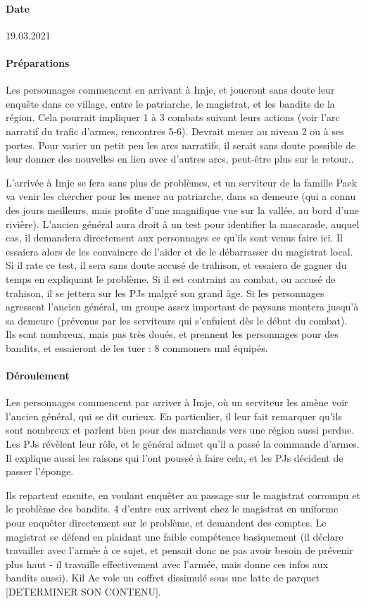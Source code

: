 \documentclass[10pt,a4paper]{book}
\begin{document}
\paragraph{Date}19.03.2021
\paragraph{Préparations}
Les personnages commencent en arrivant à Imje, et joueront sans doute leur enquête dans ce village, entre le patriarche, le magistrat, et les bandits de la région. Cela pourrait impliquer 1 à 3 combats suivant leurs actions (voir l'arc narratif du trafic d'armes, rencontres 5-6). Devrait mener au niveau 2 ou à ses portes. Pour varier un petit peu les arcs narratifs, il serait sans doute possible de leur donner des nouvelles en lien avec d'autres arcs, peut-être plus sur le retour.. 

L'arrivée à Imje se fera sans plus de problèmes, et un serviteur de la famille Paek va venir les chercher pour les mener au patriarche, dans sa demeure (qui a connu des jours meilleurs, mais profite d'une magnifique vue sur la vallée, au bord d'une rivière). L'ancien général aura droit à un test pour identifier la mascarade, auquel cas, il demandera directement aux personnages ce qu'ils sont venus faire ici. Il essaiera alors de les convaincre de l'aider et de le débarrasser du magistrat local. Si il rate ce test, il sera sans doute accusé de trahison, et essaiera de gagner du temps en expliquant le problème. Si il est contraint au combat, ou accusé de trahison, il se jettera sur les PJs malgré son grand âge. Si les personnages agressent l'ancien général, un groupe assez important de paysans montera jusqu'à sa demeure (prévenus par les serviteurs qui s'enfuient dès le début du combat). Ils sont nombreux, mais pas très doués, et prennent les personnages pour des bandits, et essaieront de les tuer : 8 commoners mal équipés.
\paragraph{Déroulement}
Les personnages commencent par arriver à Imje, où un serviteur les amène voir l'ancien général, qui se dit curieux. En particulier, il leur fait remarquer qu'ils sont nombreux et parlent bien pour des marchands vers une région aussi perdue. Les PJs révèlent leur rôle, et le général admet qu'il a passé la commande d'armes. Il explique aussi les raisons qui l'ont poussé à faire cela, et les PJs décident de passer l'éponge.

Ils repartent ensuite, en voulant enquêter au passage sur le magistrat corrompu et le problème des bandits. 4 d'entre eux arrivent chez le magistrat en uniforme pour enquêter directement sur le problème, et demandent des comptes. Le magistrat se défend en plaidant une faible compétence basiquement (il déclare travailler avec l'armée à ce sujet, et pensait donc ne pas avoir besoin de prévenir plus haut - il travaille effectivement avec l'armée, mais donne ces infos aux bandits aussi). Kil Ae vole un coffret dissimulé sous une latte de parquet [DETERMINER SON CONTENU]. 
\end{document}
